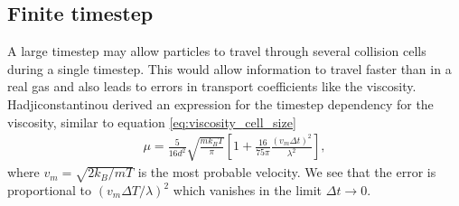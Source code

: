 \subsection{Finite timestep}
A large timestep may allow particles to travel through several collision cells during a single timestep. This would allow information to travel faster than in a real gas and also leads to errors in transport coefficients like the viscosity. Hadjiconstantinou \cite{hadjiconstantinou2000analysis} derived an expression for the timestep dependency for the viscosity, similar to equation \eqref{eq:viscosity_cell_size}
\begin{align}
	\mu = \frac{5}{16d^2}\sqrt{\frac{mk_B T}{\pi}} \left [1 + \frac{16}{75\pi}\frac{(v_m\Delta t)^2}{\lambda^2}\right],
\end{align}
where $v_m=\sqrt{2k_B/mT}$ is the most probable velocity. We see that the error is proportional to $(v_m\Delta T/\lambda)^2$ which vanishes in the limit $\Delta t\rightarrow 0$. 